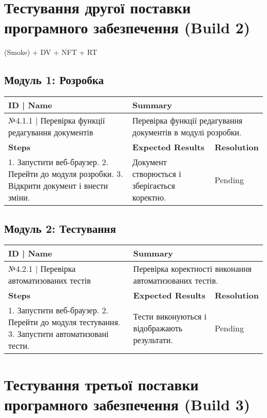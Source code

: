 \documentclass[oneside,14pt]{extarticle}
\begin{document}
\begin{normalsize}
	\section*{Тестування другої поставки програмного забезпечення (Build 2)}
	
	(Smoke) + DV + NFT + RT
	
	\subsection*{Модуль 1: Розробка}
	\begin{longtable}{|p{7cm}|p{3.5cm}|p{3.5cm}|}
		\hline
		\textbf{ID | Name} & \multicolumn{2}{|p{7cm}|}{\textbf{Summary}}
		\\\hline
		№4.1.1 | Перевірка функції редагування документів & \multicolumn{2}{|p{7cm}|}{Перевірка функції редагування документів в модулі розробки.}
		\\\hline
		\textbf{Steps} & \textbf{Expected Results} & \textbf{Resolution}
		\\\hline
		1. Запустити веб-браузер. 2. Перейти до модуля розробки. 3. Відкрити документ і внести зміни.
		& Документ створюється і зберігається коректно.
		& Pending
		\\\hline
	\end{longtable}
	
	\subsection*{Модуль 2: Тестування}
	\begin{longtable}{|p{7cm}|p{3.5cm}|p{3.5cm}|}
		\hline
		\textbf{ID | Name} & \multicolumn{2}{|p{7cm}|}{\textbf{Summary}}
		\\\hline
		№4.2.1 | Перевірка автоматизованих тестів & \multicolumn{2}{|p{7cm}|}{Перевірка коректності виконання автоматизованих тестів.}
		\\\hline
		\textbf{Steps} & \textbf{Expected Results} & \textbf{Resolution}
		\\\hline
		1. Запустити веб-браузер. 2. Перейти до модуля тестування. 3. Запустити автоматизовані тести.
		& Тести виконуються і відображають результати.
		& Pending
		\\\hline
	\end{longtable}
	
	\section*{Тестування третьої поставки програмного забезпечення (Build 3)}
	

\end{normalsize}
\end{document}
